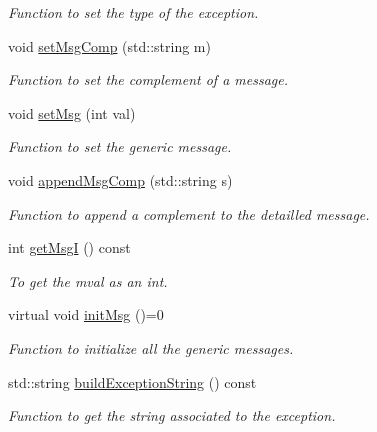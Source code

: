 \begin{DoxyCompactItemize}
\begin{DoxyCompactList}\small\item\em Function to set the type of the exception. \item\end{DoxyCompactList}\item 
void \hyperlink{classVishnuException_a07556bed229d900b994cb9dcdbf2984f}{setMsgComp} (std::string m)
\begin{DoxyCompactList}\small\item\em Function to set the complement of a message. \item\end{DoxyCompactList}\item 
void \hyperlink{classVishnuException_a5a18ccd681b23f9b3c444bb69962ed24}{setMsg} (int val)
\begin{DoxyCompactList}\small\item\em Function to set the generic message. \item\end{DoxyCompactList}\item 
void \hyperlink{classVishnuException_a0f1a2665f54991986429c32bd905ceed}{appendMsgComp} (std::string s)
\begin{DoxyCompactList}\small\item\em Function to append a complement to the detailled message. \item\end{DoxyCompactList}\item 
\hypertarget{classVishnuException_ac17d2964e09c2df48c8ce3e88e1127eb}{
int \hyperlink{classVishnuException_ac17d2964e09c2df48c8ce3e88e1127eb}{getMsgI} () const }
\label{classVishnuException_ac17d2964e09c2df48c8ce3e88e1127eb}

\begin{DoxyCompactList}\small\item\em To get the mval as an int. \item\end{DoxyCompactList}\item 
\hypertarget{classVishnuException_a2efc99faea879e45b372787a96ced5dd}{
virtual void \hyperlink{classVishnuException_a2efc99faea879e45b372787a96ced5dd}{initMsg} ()=0}
\label{classVishnuException_a2efc99faea879e45b372787a96ced5dd}

\begin{DoxyCompactList}\small\item\em Function to initialize all the generic messages. \item\end{DoxyCompactList}\item 
std::string \hyperlink{classVishnuException_a22a9ad3e0f438accd20442a7a6ffcb58}{buildExceptionString} () const 
\begin{DoxyCompactList}\small\item\em Function to get the string associated to the exception. \item\end{DoxyCompactList}\end{DoxyCompactItemize}
